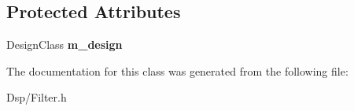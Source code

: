\subsection*{Protected Attributes}
\begin{DoxyCompactItemize}
\item 
\hypertarget{classDsp_1_1FilterDesignBase_a29cf94a1b623a3d8e5414f1120a53da9}{Design\-Class {\bfseries m\-\_\-design}}\label{classDsp_1_1FilterDesignBase_a29cf94a1b623a3d8e5414f1120a53da9}

\end{DoxyCompactItemize}


The documentation for this class was generated from the following file\-:\begin{DoxyCompactItemize}
\item 
Dsp/Filter.\-h\end{DoxyCompactItemize}
